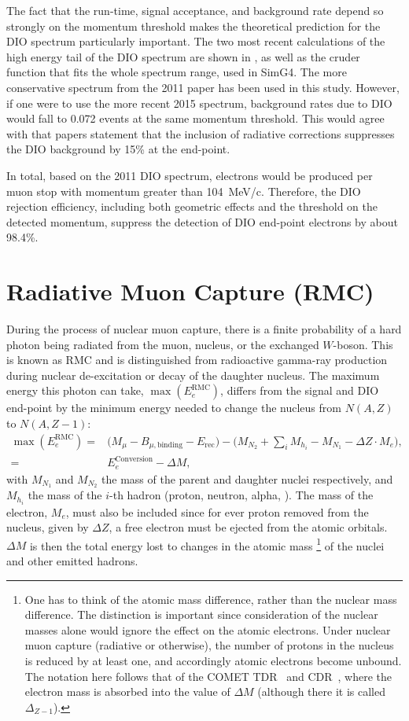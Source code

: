 \FigDIOEndPointComparison
The fact that the run-time, signal acceptance, and background rate depend so strongly on the momentum threshold makes the theoretical prediction for the \ac{DIO} spectrum particularly important.
The two most recent calculations of the high energy tail of the DIO spectrum are shown in , as well as the cruder function that fits the whole spectrum range, used in SimG4.
The more conservative spectrum from the 2011 paper has been used in this study.
However, if one were to use the more recent 2015 spectrum, background rates due to DIO would fall to 0.072 events at the same momentum threshold.
This would agree with that papers statement that the inclusion of radiative corrections suppresses the DIO background by 15\% at the end-point.

In total, based on the 2011 DIO spectrum,  electrons would be produced per muon stop with momentum greater than 104~MeV/c.
Therefore, the DIO rejection efficiency, including both geometric effects and the threshold on the detected momentum, suppress the detection of DIO end-point electrons by about 98.4\%.

\section{Radiative Muon Capture (\acs{RMC})}
\TabRMCEndPoints%
During the process of nuclear muon capture, there is a finite probability of a hard photon being radiated from the muon, nucleus, or the exchanged $W$-boson.
This is known as \acf{RMC} and is distinguished from radioactive gamma-ray production during nuclear de-excitation or decay of the daughter nucleus.
The maximum energy this photon can take, $\max(E_e^\textrm{RMC})$, differs from the \mueconv signal and \ac{DIO} end-point by the minimum energy needed to change the nucleus from $N(A,Z)$ to $N(A,Z-1)$:
\begin{align}
\max(E_e^\textrm{RMC})=&\big(M_\mu - B_{\mu,\textrm{binding}} - E_\textrm{rec}\big)-\big(M_{N_2}+\sum_iM_{h_i}-M_{N_1}-\Delta{}Z\cdot{}M_e\big),\\
                      =&E^\textrm{Conversion}_e  - \Delta{}M,
\end{align}
with $M_{N_1}$ and $M_{N_2}$ the mass of the parent and daughter nuclei respectively, and $M_{h_i}$ the mass of the $i$-th hadron (proton, neutron, alpha, \etc).
The mass of the electron, $M_e$, must also be included since for ever proton removed from the nucleus, given by $\Delta{}Z$, a free electron must be ejected from the atomic orbitals.
$\Delta{}M$ is then the total energy lost to changes in the atomic mass%
\footnote{
One has to think of the atomic mass difference, rather than the nuclear mass difference.
The distinction is important since consideration of the nuclear masses alone would ignore the effect on the atomic electrons.
Under nuclear muon capture (radiative or otherwise), the number of protons in the nucleus is reduced by at least one, and accordingly atomic electrons become unbound.
The notation here follows that of the COMET TDR~\cite{TDR2016} and CDR~\cite{CDRphase2}, where the electron mass is absorbed into the value of $\Delta{}M$ (although there it is called $\Delta_{Z-1}$).
}
of the nuclei and other emitted hadrons.

